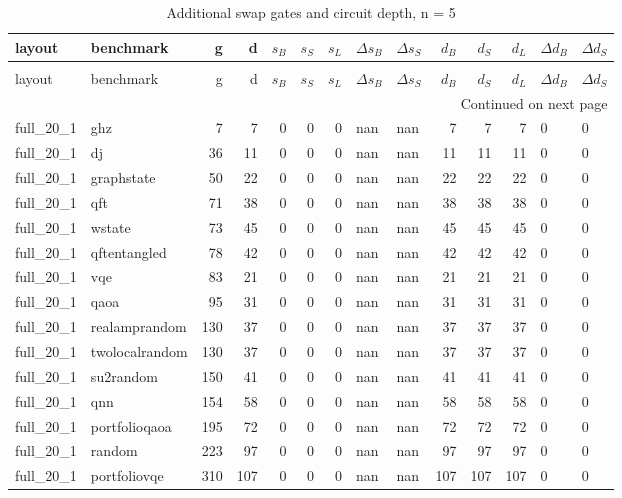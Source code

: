 \begin{longtable}{llrrrrrllrrrll}
\caption{Additional swap gates and circuit depth, n = 5} \label{benchmark-table-5} \\
\toprule
layout & benchmark & g & d & $s_B$ & $s_S$ & $s_L$ & $\Delta s_B$ & $\Delta s_S$ & $d_B$ & $d_S$ & $d_L$ & $\Delta d_B$ & $\Delta d_S$ \\
\midrule
\endfirsthead
\caption[]{Additional swap gates and circuit depth, n = 5} \\
\toprule
layout & benchmark & g & d & $s_B$ & $s_S$ & $s_L$ & $\Delta s_B$ & $\Delta s_S$ & $d_B$ & $d_S$ & $d_L$ & $\Delta d_B$ & $\Delta d_S$ \\
\midrule
\endhead
\midrule
\multicolumn{14}{r}{Continued on next page} \\
\midrule
\endfoot
\bottomrule
\endlastfoot
full\_20\_1 & ghz & 7 & 7 & 0 & 0 & 0 & nan & nan & 7 & 7 & 7 & 0 & 0 \\
full\_20\_1 & dj & 36 & 11 & 0 & 0 & 0 & nan & nan & 11 & 11 & 11 & 0 & 0 \\
full\_20\_1 & graphstate & 50 & 22 & 0 & 0 & 0 & nan & nan & 22 & 22 & 22 & 0 & 0 \\
full\_20\_1 & qft & 71 & 38 & 0 & 0 & 0 & nan & nan & 38 & 38 & 38 & 0 & 0 \\
full\_20\_1 & wstate & 73 & 45 & 0 & 0 & 0 & nan & nan & 45 & 45 & 45 & 0 & 0 \\
full\_20\_1 & qftentangled & 78 & 42 & 0 & 0 & 0 & nan & nan & 42 & 42 & 42 & 0 & 0 \\
full\_20\_1 & vqe & 83 & 21 & 0 & 0 & 0 & nan & nan & 21 & 21 & 21 & 0 & 0 \\
full\_20\_1 & qaoa & 95 & 31 & 0 & 0 & 0 & nan & nan & 31 & 31 & 31 & 0 & 0 \\
full\_20\_1 & realamprandom & 130 & 37 & 0 & 0 & 0 & nan & nan & 37 & 37 & 37 & 0 & 0 \\
full\_20\_1 & twolocalrandom & 130 & 37 & 0 & 0 & 0 & nan & nan & 37 & 37 & 37 & 0 & 0 \\
full\_20\_1 & su2random & 150 & 41 & 0 & 0 & 0 & nan & nan & 41 & 41 & 41 & 0 & 0 \\
full\_20\_1 & qnn & 154 & 58 & 0 & 0 & 0 & nan & nan & 58 & 58 & 58 & 0 & 0 \\
full\_20\_1 & portfolioqaoa & 195 & 72 & 0 & 0 & 0 & nan & nan & 72 & 72 & 72 & 0 & 0 \\
full\_20\_1 & random & 223 & 97 & 0 & 0 & 0 & nan & nan & 97 & 97 & 97 & 0 & 0 \\
full\_20\_1 & portfoliovqe & 310 & 107 & 0 & 0 & 0 & nan & nan & 107 & 107 & 107 & 0 & 0 \\

\end{longtable}
